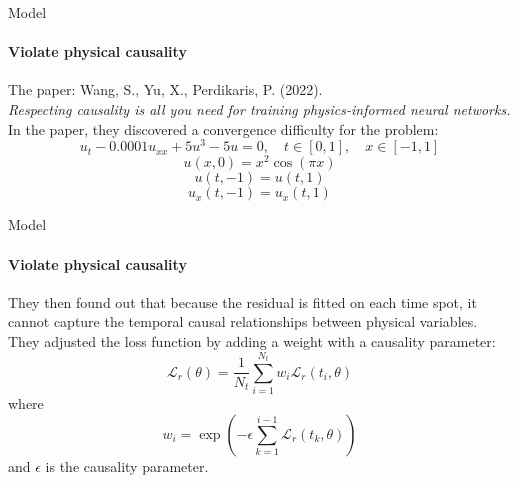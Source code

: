     \begin{frame}{Model}
    \framesubtitle{Violate physical causality}
        The paper: Wang, S., Yu, X., Perdikaris, P. (2022).\\
        \textit{Respecting causality is all you need for training physics-informed neural networks.}\\
    
        In the paper, they discovered a convergence difficulty for the problem:
        \begin{equation}
        u_t - 0.0001u_{xx} + 5u^3 - 5u = 0, \quad t \in [0, 1], \quad x \in [-1, 1]
        \end{equation}
        \begin{equation}
        u(x, 0) = x^2 \cos(\pi x)
        \end{equation}
        \begin{equation}
        u(t, -1) = u(t, 1)
        \end{equation}
        \begin{equation}
        u_x(t, -1) = u_x(t, 1)
        \end{equation}
    \end{frame}
    
    \begin{frame}{Model}
    \framesubtitle{Violate physical causality}
        They then found out that because the residual is fitted on each time spot, it cannot capture the temporal causal relationships between physical variables. They adjusted the loss function by adding a weight with a causality parameter:
        \begin{equation}
        \mathcal{L}_r(\theta) = \frac{1}{N_t} \sum_{i=1}^{N_t} w_i \mathcal{L}_r(t_i, \theta)
        \end{equation}
        where
        \begin{equation}
        w_i = \exp \left( -\epsilon \sum_{k=1}^{i-1} \mathcal{L}_r(t_k, \theta) \right)
        \end{equation}
        and \( \epsilon \) is the causality parameter.
    \end{frame}
    
